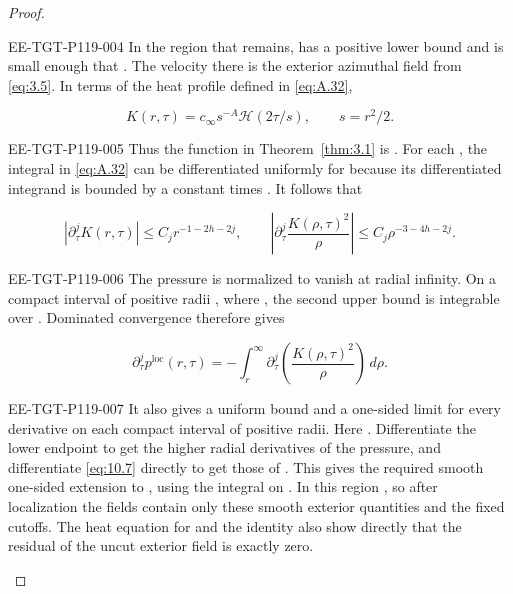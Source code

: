 \begin{proof}
\begin{EESegment}{EE-TGT-P119-004}
In the region that remains,  has a positive lower bound and
 is small enough that
. The velocity there is the exterior azimuthal field
 from \eqref{eq:3.5}. In terms of the heat profile
 defined in \eqref{eq:A.32},
\end{EESegment}
\begin{equation}
K(r,\tau)=c_\infty s^{-A}\mathcal H(2\tau/s),
\qquad s=r^2/2.
\tag{10.7}\label{eq:10.7}
\end{equation}
\begin{EESegment}{EE-TGT-P119-005}
Thus the function in Theorem~\ref{thm:3.1} is
. For each
, the integral in \eqref{eq:A.32} can be differentiated uniformly for
 because its differentiated integrand is bounded by a constant times
. It follows that
\end{EESegment}
\begin{equation}
|\partial_\tau^jK(r,\tau)|\leq C_jr^{-1-2h-2j},
\qquad
\left|\partial_\tau^j\frac{K(\rho,\tau)^2}{\rho}\right|
\leq C_j\rho^{-3-4h-2j}.
\tag{10.8}\label{eq:10.8}
\end{equation}
\begin{EESegment}{EE-TGT-P119-006}
The pressure is normalized to vanish at radial infinity. On a compact interval of positive radii
, where , the second upper bound
is integrable over . Dominated convergence therefore gives
\end{EESegment}
\[
\partial_\tau^jp^{\mathrm{loc}}(r,\tau)
=-\int_r^\infty\partial_\tau^j\left(\frac{K(\rho,\tau)^2}{\rho}\right)\,d\rho.
\]
\begin{EESegment}{EE-TGT-P119-007}
It also gives a uniform bound and a one-sided limit for every derivative on each compact interval of
positive radii. Here . Differentiate the lower
endpoint to get the higher radial derivatives of the pressure, and differentiate \eqref{eq:10.7}
directly to get those of . This gives the required smooth one-sided
extension to , using the integral on
. In this region , so after
localization the fields contain only these smooth exterior quantities and the fixed cutoffs. The
heat equation for  and the identity
 also show directly that the residual of the
uncut exterior field is exactly zero.
\end{EESegment}


\end{proof}
